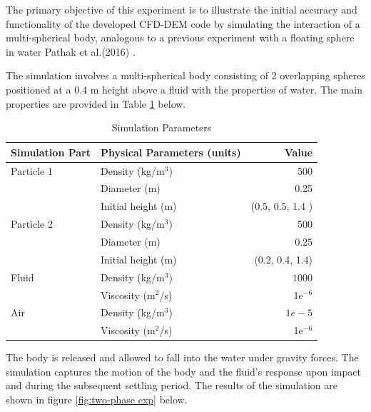 The primary objective of this experiment is to illustrate the initial accuracy and functionality of the developed CFD-DEM code by simulating the interaction of a multi-spherical body, analogous to a previous experiment with a floating sphere in water Pathak et al.(2016) \cite{pathak20163d}.

The simulation involves a multi-spherical body consisting of 2 overlapping spheres positioned at a $0.4$ m height above a fluid with the properties of water. The main properties are provided in Table \ref{table3-chap4} below.
\begin{table}[H]
    \centering
    \caption{Simulation Parameters} \label{table3-chap4}
    \begin{tabular}{llr}
        \toprule
        \hline
        Simulation Part         & Physical Parameters (units) & Value \\
        \hline
        \midrule
        Particle 1                & Density (kg/m$^3$)          & 500    \\
                         & Diameter (m)          & 0.25    \\
                         & Initial height (m)          & (0.5, 0.5, 1.4 )  \\
        Particle 2                & Density (kg/m$^3$)          & 500    \\
                         & Diameter (m)          & 0.25   \\
                         & Initial height (m)          &  (0.2, 0.4, 1.4)     \\
                         \hline
                                 Fluid                  & Density (kg/m$^3$)           & $1000$   \\
                                & Viscosity (m$^2$/s)         & 1e$^{-6}$    \\
                                \hline
         Air                  & Density (kg/m$^3$)           & $1e-5$   \\
                                & Viscosity (m$^2$/s)         & 1e$^{-6}$    \\
                                \hline
        \bottomrule
     \end{tabular}
\end{table}

The body is released and allowed to fall into the water under gravity forces. The simulation captures the motion of the body and the fluid's response upon impact and during the subsequent settling period. The results of the simulation are shown in figure \ref{fig:two-phase exp} below.

